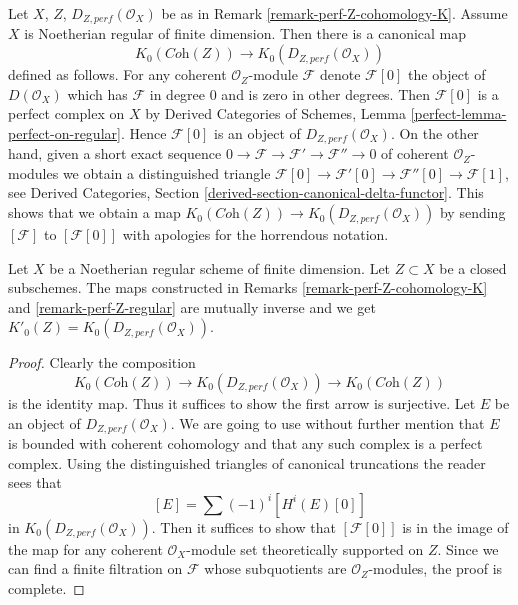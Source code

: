 \begin{remark}
\label{remark-perf-Z-regular}
Let $X$, $Z$, $D_{Z, perf}(\mathcal{O}_X)$ be as in
Remark \ref{remark-perf-Z-cohomology-K}.
Assume $X$ is Noetherian regular of finite dimension.
Then there is a canonical map
$$
K_0(\textit{Coh}(Z)) \longrightarrow K_0(D_{Z, perf}(\mathcal{O}_X))
$$
defined as follows. For any coherent $\mathcal{O}_Z$-module
$\mathcal{F}$ denote $\mathcal{F}[0]$ the object of $D(\mathcal{O}_X)$
which has $\mathcal{F}$ in degree $0$ and is zero in other degrees.
Then $\mathcal{F}[0]$ is a perfect complex on $X$ by
Derived Categories of Schemes, Lemma \ref{perfect-lemma-perfect-on-regular}.
Hence $\mathcal{F}[0]$ is an object of $D_{Z, perf}(\mathcal{O}_X)$.
On the other hand, given a short exact sequence
$0 \to \mathcal{F} \to \mathcal{F}' \to \mathcal{F}'' \to 0$ of
coherent $\mathcal{O}_Z$-modules we obtain a distinguished triangle
$\mathcal{F}[0] \to \mathcal{F}'[0] \to \mathcal{F}''[0] \to \mathcal{F}[1]$,
see Derived Categories, Section \ref{derived-section-canonical-delta-functor}.
This shows that we obtain a map
$K_0(\textit{Coh}(Z)) \to K_0(D_{Z, perf}(\mathcal{O}_X))$
by sending $[\mathcal{F}]$ to $[\mathcal{F}[0]]$
with apologies for the horrendous notation.
\end{remark}

\begin{lemma}
\label{lemma-perf-Z-regular}
Let $X$ be a Noetherian regular scheme of finite dimension.
Let $Z \subset X$ be a closed subschemes. The maps constructed
in Remarks \ref{remark-perf-Z-cohomology-K} and
\ref{remark-perf-Z-regular} are mutually inverse and we get
$K'_0(Z) = K_0(D_{Z, perf}(\mathcal{O}_X))$.
\end{lemma}

\begin{proof}
Clearly the composition
$$
K_0(\textit{Coh}(Z)) \longrightarrow
K_0(D_{Z, perf}(\mathcal{O}_X)) \longrightarrow
K_0(\textit{Coh}(Z))
$$
is the identity map. Thus it suffices to show the first arrow is
surjective. Let $E$ be an object of $D_{Z, perf}(\mathcal{O}_X)$.
We are going to use without further mention that $E$ is bounded
with coherent cohomology and that any such complex is a perfect complex.
Using the distinguished triangles of canonical truncations the
reader sees that
$$
[E] = \sum (-1)^i[H^i(E)[0]]
$$
in $K_0(D_{Z, perf}(\mathcal{O}_X))$. Then it suffices to
show that $[\mathcal{F}[0]]$ is in the image of the map
for any coherent $\mathcal{O}_X$-module set theoretically
supported on $Z$. Since we can find a finite filtration on
$\mathcal{F}$ whose subquotients are $\mathcal{O}_Z$-modules,
the proof is complete.
\end{proof}

